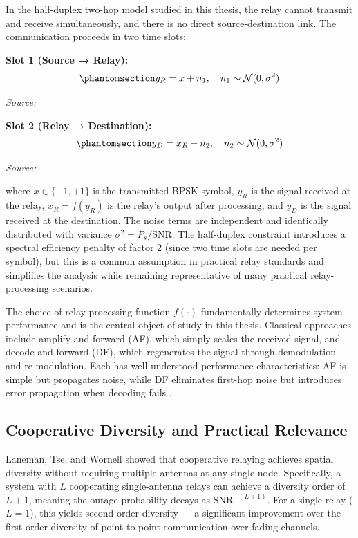 In the half-duplex two-hop model studied in this thesis, the relay cannot transmit and receive simultaneously, and there is no direct source-destination link. The communication proceeds in two time slots:

\textbf{Slot 1 (Source → Relay):} \begin{equation}\protect\phantomsection\label{eq:awgn-hop1}{y_R = x + n_1, \quad n_1 \sim \mathcal{N}(0, \sigma^2)
}\end{equation} \par{\small\textit{Source: \cite{laneman2004cooperative}}}

\textbf{Slot 2 (Relay → Destination):} \begin{equation}\protect\phantomsection\label{eq:awgn-hop2}{y_D = x_R + n_2, \quad n_2 \sim \mathcal{N}(0, \sigma^2)
}\end{equation} \par{\small\textit{Source: \cite{laneman2004cooperative}}}

where \(x \in \{-1, +1\}\) is the transmitted BPSK symbol, \(y_R\) is the signal received at the relay, \(x_R = f(y_R)\) is the relay's output after processing, and \(y_D\) is the signal received at the destination. The noise terms are independent and identically distributed with variance \(\sigma^2 = P_s / \text{SNR}\). The half-duplex constraint introduces a spectral efficiency penalty of factor 2 (since two time slots are needed per symbol), but this is a common assumption in practical relay standards and simplifies the analysis while remaining representative of many practical relay-processing scenarios.

The choice of relay processing function \(f(\cdot)\) fundamentally determines system performance and is the central object of study in this thesis. Classical approaches include amplify-and-forward (AF), which simply scales the received signal, and decode-and-forward (DF), which regenerates the signal through demodulation and re-modulation. Each has well-understood performance characteristics: AF is simple but propagates noise, while DF eliminates first-hop noise but introduces error propagation when decoding fails \cite{cover1979capacity}.

\subsection{Cooperative Diversity and Practical Relevance}\label{sec:cooperative-diversity-and-practical-relevance}

Laneman, Tse, and Wornell \cite{laneman2004cooperative} showed that cooperative relaying achieves spatial diversity without requiring multiple antennas at any single node. Specifically, a system with \(L\) cooperating single-antenna relays can achieve a diversity order of \(L + 1\), meaning the outage probability decays as \(\text{SNR}^{-(L+1)}\). For a single relay (\(L=1\)), this yields second-order diversity --- a significant improvement over the first-order diversity of point-to-point communication over fading channels.

